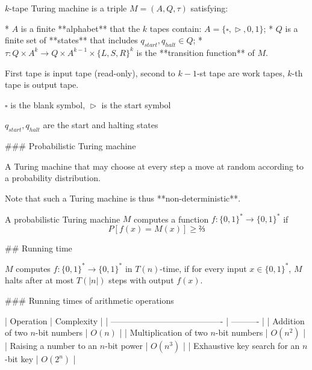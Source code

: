 $k$-tape Turing machine is a triple $M = (A,Q,τ)$ satisfying:

*  $A$ is a finite **alphabet** that the $k$ tapes contain:
   $A = \lbrace{\square, \vartriangleright, 0, 1}\rbrace$;
*  $Q$ is a finite set of **states** that includes $q_{start}, q_{halt} ∈ Q$;
*  $τ: Q × A^k → Q × A^{k−1} × \lbrace{L,S,R}\rbrace^k$ is the
   **transition function** of $M$.
   
First tape is input tape (read-only), second to $k-1$-st tape are work tapes, $k$-th tape is output tape.

$\square$ is the blank symbol, $\vartriangleright$ is the start symbol

$q_{start}, q_{halt}$ are the start and halting states


### Probabilistic Turing machine

A Turing machine that may choose at every step a move at random according to a
probability distribution.

Note that such a Turing machine is thus **non-deterministic**.

A probabilistic Turing machine $M$ computes a function
$f: \lbrace{0, 1}\rbrace^* → \lbrace{0, 1}\rbrace^*$ if
$$P[f(x) = M(x)] ≥ ⅔
$$

## Running time

$M$ computes $f: \lbrace{0, 1}\rbrace^* → \lbrace{0, 1}\rbrace^*$ in
$T(n)$-time, if for every input $x ∈ \lbrace{0, 1}\rbrace^*$, $M$ halts after at
most $T(|n|)$ steps with output $f(x)$.

### Running times of arithmetic operations

| Operation                                | Complexity |
| ---------------------------------------- | ---------- |
| Addition of two $n$-bit numbers          | $O(n)$     |
| Multiplication of two $n$-bit numbers    | $O(n^2)$   |
| Raising a number to an $n$-bit power     | $O(n^3)$   |
| Exhaustive key search for an $n$-bit key | $O(2^n)$   |
